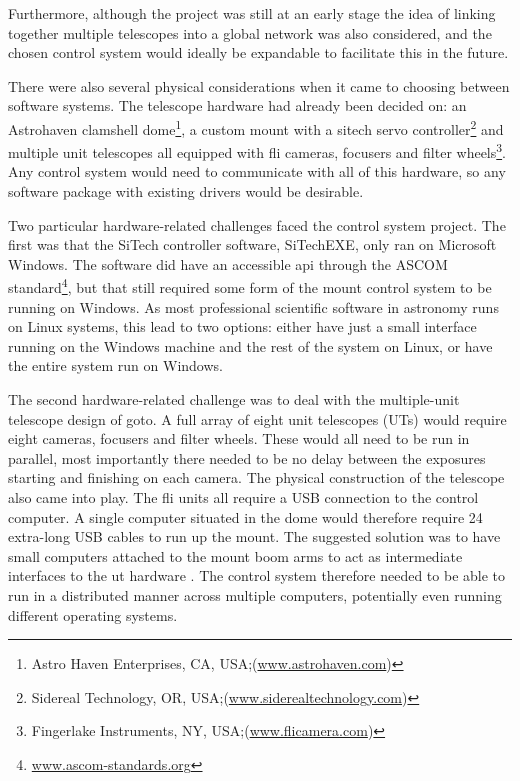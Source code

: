 \begin{colsection}
\begin{colsection}
Furthermore, although the project was still at an early stage the idea of linking together multiple telescopes into a global network was also considered, and the chosen control system would ideally be expandable to facilitate this in the future.

There were also several physical considerations when it came to choosing between software systems. The telescope hardware had already been decided on: an Astrohaven clamshell dome\footnote{Astro Haven Enterprises, CA, USA;\@ (\url{www.astrohaven.com})}, a custom mount with a \gls{sitech} servo controller\footnote{Sidereal Technology, OR, USA;\@ (\url{www.siderealtechnology.com})} and multiple unit telescopes all equipped with \gls{fli} cameras, focusers and filter wheels\footnote{Fingerlake Instruments, NY, USA;\@ (\url{www.flicamera.com})}. Any control system would need to communicate with all of this hardware, so any software package with existing drivers would be desirable. 

Two particular hardware-related challenges faced the control system project. The first was that the SiTech controller software, SiTechEXE, only ran on Microsoft Windows. The software did have an accessible \gls{api} through the ASCOM standard\footnote{\url{www.ascom-standards.org}}, but that still required some form of the mount control system to be running on Windows. As most professional scientific software in astronomy runs on Linux systems, this lead to two options: either have just a small interface running on the Windows machine and the rest of the system on Linux, or have the entire system run on Windows.

The second hardware-related challenge was to deal with the multiple-unit telescope design of \gls{goto}. A full array of eight unit telescopes (UTs) would require eight cameras, focusers and filter wheels. These would all need to be run in parallel, most importantly there needed to be no delay between the exposures starting and finishing on each camera. The physical construction of the telescope also came into play. The \gls{fli} units all require a USB connection to the control computer. A single computer situated in the dome would therefore require 24 extra-long USB cables to run up the mount. The suggested solution was to have small computers attached to the mount boom arms to act as intermediate interfaces to the \gls{ut} hardware . The control system therefore needed to be able to run in a distributed manner across multiple computers, potentially even running different operating systems.


\end{colsection}
\end{colsection}
